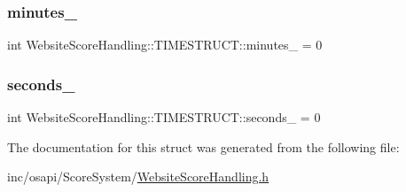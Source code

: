 \subsubsection{\texorpdfstring{minutes\+\_\+}{minutes\_}}
{\footnotesize\ttfamily int Website\+Score\+Handling\+::\+T\+I\+M\+E\+S\+T\+R\+U\+C\+T\+::minutes\+\_\+ = 0}

\mbox{\label{struct_website_score_handling_1_1_t_i_m_e_s_t_r_u_c_t_acc25fc79f34ee8cae266c5a748bd1ca5}} 
\subsubsection{\texorpdfstring{seconds\+\_\+}{seconds\_}}
{\footnotesize\ttfamily int Website\+Score\+Handling\+::\+T\+I\+M\+E\+S\+T\+R\+U\+C\+T\+::seconds\+\_\+ = 0}



The documentation for this struct was generated from the following file\+:\begin{DoxyCompactItemize}
\item 
inc/osapi/\+Score\+System/\hyperlink{_website_score_handling_8h}{Website\+Score\+Handling.\+h}\end{DoxyCompactItemize}
